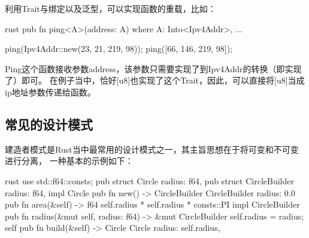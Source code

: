 利用Trait与绑定以及泛型，可以实现函数的重载，比如：
\begin{code-block}{rust}
pub fn ping<A>(address: A)
where
    A: Into<Ipv4Addr>,
{
    ...
}

ping(Ipv4Addr::new(23, 21, 219, 98));
ping([66, 146, 219, 98]);
\end{code-block}
Ping这个函数接收参数address，该参数只需要实现了到Ipv4Addr的转换（即实现了）即可。
在例子当中，恰好[u8]也实现了这个Trait，因此，可以直接将[u8]当成ip地址参数传递给函数。

\subsection{常见的设计模式}
建造者模式是Rust当中最常用的设计模式之一，其主旨思想在于将可变和不可变进行分离，
一种基本的示例如下：
\begin{code-block}{rust}
use std::f64::consts;
pub struct Circle {
    radius: f64,
}
pub struct CircleBuilder {
    radius: f64,
}
impl Circle {
    pub fn new() -> CircleBuilder {
        CircleBuilder { radius: 0.0 }
    }
    pub fn area(&self) -> f64 {
        self.radius * self.radius * consts::PI
    }
}
impl CircleBuilder {
    pub fn radius(&mut self, radius: f64) -> &mut CircleBuilder {
        self.radius = radius;
        self
    }
    pub fn build(&self) -> Circle {
        Circle {
            radius: self.radius,
        }
    }
}
\end{code-block}

